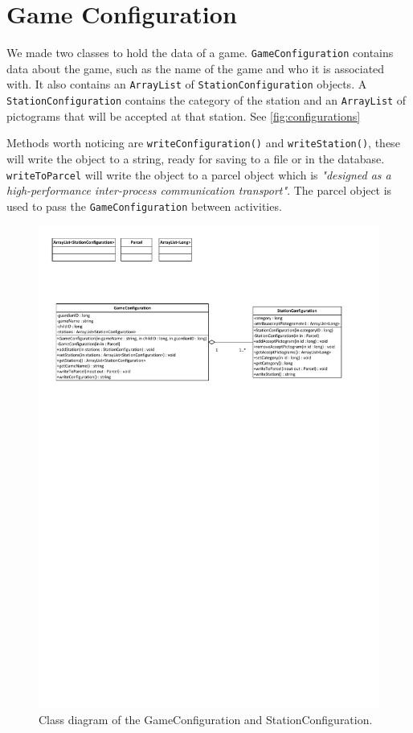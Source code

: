 \section{Game Configuration}
\label{gameconfiguration}
We made two classes to hold the data of a game. \lstinline|GameConfiguration| contains data about the game, such as the name of the game and who it is associated with. It also contains an \lstinline|ArrayList| of \lstinline|StationConfiguration| objects. A \lstinline|StationConfiguration| contains the category of the station and an \lstinline|ArrayList| of pictograms that will be accepted at that station. See \autoref{fig:configurations}

Methods worth noticing are \lstinline|writeConfiguration()| and \lstinline|writeStation()|, these will write the object to a string, ready for saving to a file or in the database. \lstinline|writeToParcel| will write the object to a parcel object which is \textit{"designed as a high-performance inter-process communication transport"}\citep{parcel}.
The parcel object is used to pass the \lstinline|GameConfiguration| between activities.
\begin{figure}[H]
\includegraphics[width=1.0\linewidth,page=2]{img/configurations.pdf}%
\caption{Class diagram of the GameConfiguration and StationConfiguration.}
\label{fig:configurations}
\end{figure}

